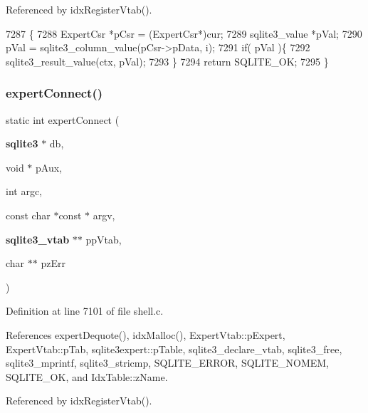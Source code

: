 Referenced by idx\+Register\+Vtab().


\begin{DoxyCode}
7287                                                                               \{
7288   ExpertCsr *pCsr = (ExpertCsr*)cur;
7289   sqlite3_value *pVal;
7290   pVal = sqlite3_column_value(pCsr->pData, i);
7291   \textcolor{keywordflow}{if}( pVal )\{
7292     sqlite3_result_value(ctx, pVal);
7293   \}
7294   \textcolor{keywordflow}{return} SQLITE_OK;
7295 \}
\end{DoxyCode}
\mbox{\label{shell_8c_a98e84d3e375f92a22b69a558c06dab0d}} 
\subsubsection{expert\+Connect()}
{\footnotesize\ttfamily static int expert\+Connect (\begin{DoxyParamCaption}\item[{\textbf{ sqlite3} $\ast$}]{db,  }\item[{void $\ast$}]{p\+Aux,  }\item[{int}]{argc,  }\item[{const char $\ast$const $\ast$}]{argv,  }\item[{\textbf{ sqlite3\+\_\+vtab} $\ast$$\ast$}]{pp\+Vtab,  }\item[{char $\ast$$\ast$}]{pz\+Err }\end{DoxyParamCaption})\hspace{0.3cm}{\ttfamily [static]}}



Definition at line 7101 of file shell.\+c.



References expert\+Dequote(), idx\+Malloc(), Expert\+Vtab\+::p\+Expert, Expert\+Vtab\+::p\+Tab, sqlite3expert\+::p\+Table, sqlite3\+\_\+declare\+\_\+vtab, sqlite3\+\_\+free, sqlite3\+\_\+mprintf, sqlite3\+\_\+stricmp, S\+Q\+L\+I\+T\+E\+\_\+\+E\+R\+R\+OR, S\+Q\+L\+I\+T\+E\+\_\+\+N\+O\+M\+EM, S\+Q\+L\+I\+T\+E\+\_\+\+OK, and Idx\+Table\+::z\+Name.



Referenced by idx\+Register\+Vtab().


